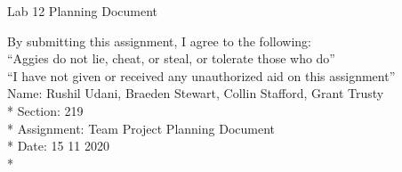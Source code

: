 \documentclass{article}
\begin{document}
{\Large Lab 12 Planning Document}
\vspace{0.25in}

\noindent
By submitting this assignment, I agree to the following: \\
\indent ``Aggies do not lie, cheat, or steal, or tolerate those who do'' \\
\indent ``I have not given or received any unauthorized aid on this assignment'' \\

\noindent
Name:        Rushil Udani, Braeden Stewart, Collin Stafford, Grant Trusty \\*
Section:     219 \\*
Assignment:  Team Project Planning Document \\*
Date:        15 11 2020 \\*

\hrulefill
\end{document}
